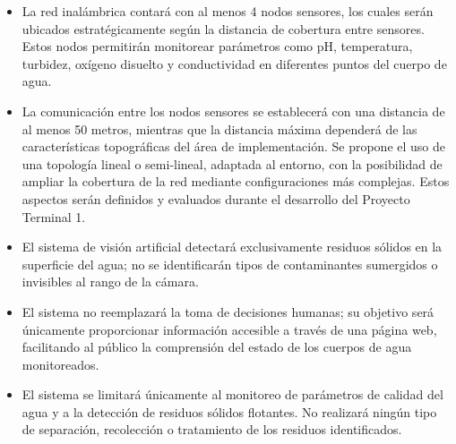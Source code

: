 \begin{itemize}

    \item La red inalámbrica contará con al menos 4 nodos sensores, los cuales serán ubicados estratégicamente según la distancia de cobertura entre sensores. Estos nodos permitirán monitorear parámetros como pH, temperatura, turbidez, oxígeno disuelto y conductividad en diferentes puntos del cuerpo de agua.

    \item La comunicación entre los nodos sensores se establecerá con una distancia de al menos 50 metros, mientras que la distancia máxima dependerá de las características topográficas del área de implementación. Se propone el uso de una topología lineal o semi-lineal, adaptada al entorno, con la posibilidad de ampliar la cobertura de la red mediante configuraciones más complejas. Estos aspectos serán definidos y evaluados durante el desarrollo del Proyecto Terminal 1.
    
    \item El sistema de visión artificial detectará exclusivamente residuos sólidos en la superficie del agua; no se identificarán tipos de contaminantes sumergidos o invisibles al rango de la cámara.
    
    \item El sistema no reemplazará la toma de decisiones humanas; su objetivo será únicamente proporcionar información accesible a través de una página web, facilitando al público la comprensión del estado de los cuerpos de agua monitoreados.
    \item El sistema se limitará únicamente al monitoreo de parámetros de calidad del agua y a la detección de residuos sólidos flotantes. No realizará ningún tipo de separación, recolección o tratamiento de los residuos identificados.

\end{itemize}

